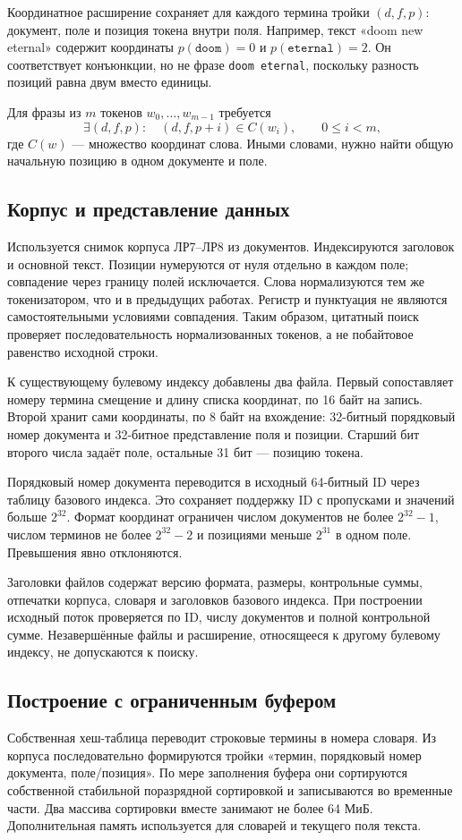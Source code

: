 \documentclass[12pt,a4paper]{article}
\begin{document}
Координатное расширение сохраняет для каждого термина тройки
$(d,f,p)$: документ, поле и позиция токена внутри поля.
Например, текст «doom new eternal» содержит координаты
$p(\texttt{doom})=0$ и $p(\texttt{eternal})=2$.
Он соответствует конъюнкции, но не фразе
\texttt{\textquotedbl doom eternal\textquotedbl}, поскольку разность позиций
равна двум вместо единицы.

Для фразы из $m$ токенов $w_0,\ldots,w_{m-1}$ требуется
\[
\exists(d,f,p):\quad(d,f,p+i)\in C(w_i),\qquad 0\leq i<m,
\]
где $C(w)$ --- множество координат слова. Иными словами,
нужно найти общую начальную позицию в одном документе и поле.

\subsection{Корпус и представление данных}
Используется снимок корпуса ЛР7--ЛР8 из \PositionDocuments{} документов.
Индексируются заголовок и основной текст. Позиции нумеруются от нуля
отдельно в каждом поле; совпадение через границу полей исключается.
Слова нормализуются тем же токенизатором, что и в предыдущих работах.
Регистр и пунктуация не являются самостоятельными условиями совпадения.
Таким образом, цитатный поиск проверяет последовательность нормализованных
токенов, а не побайтовое равенство исходной строки.

К существующему булевому индексу добавлены два файла.
Первый сопоставляет номеру термина смещение и длину списка координат,
по 16 байт на запись. Второй хранит сами координаты, по 8 байт
на вхождение: 32-битный порядковый номер документа и 32-битное
представление поля и позиции. Старший бит второго числа задаёт поле,
остальные 31 бит --- позицию токена.

Порядковый номер документа переводится в исходный 64-битный ID
через таблицу базового индекса. Это сохраняет поддержку ID с пропусками
и значений больше $2^{32}$. Формат координат ограничен числом документов
не более $2^{32}-1$, числом терминов не более $2^{32}-2$ и позициями меньше
$2^{31}$ в одном поле. Превышения явно отклоняются.

Заголовки файлов содержат версию формата, размеры, контрольные суммы,
отпечатки корпуса, словаря и заголовков базового индекса.
При построении исходный поток проверяется по ID, числу документов
и полной контрольной сумме. Незавершённые файлы и расширение,
относящееся к другому булевому индексу, не допускаются к поиску.

\subsection{Построение с ограниченным буфером}
Собственная хеш-таблица переводит строковые термины в номера словаря.
Из корпуса последовательно формируются тройки
«термин, порядковый номер документа, поле/позиция».
По мере заполнения буфера они сортируются собственной стабильной
поразрядной сортировкой и записываются во временные части.
Два массива сортировки вместе занимают не более 64 МиБ.
Дополнительная память используется для словарей и текущего поля текста.
\end{document}
